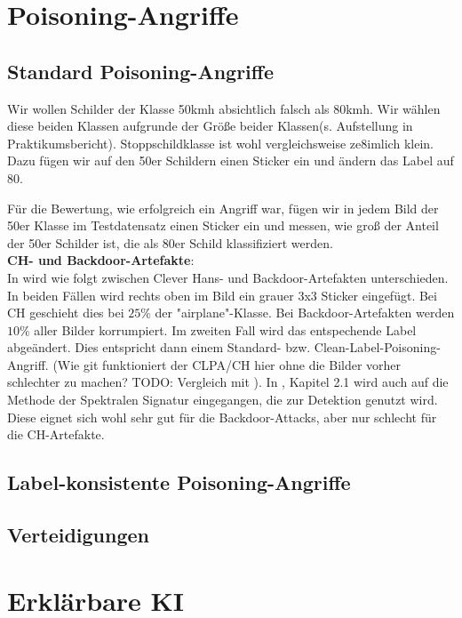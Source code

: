 \documentclass[twoside, 11pt,a4paper]{article}
\numberwithin{equation}{section}
\begin{document}
	
	\section{Poisoning-Angriffe} \label{chapter_poisoningattacks}
	\subsection{Standard Poisoning-Angriffe}
	Wir wollen Schilder der Klasse 50kmh absichtlich falsch als 80kmh. Wir wählen diese beiden Klassen aufgrunde der Größe beider Klassen(s. Aufstellung in Praktikumsbericht). Stoppschildklasse ist wohl vergleichsweise ze8imlich klein.\\
	
	Dazu fügen wir auf den 50er Schildern einen Sticker ein und ändern das Label auf 80.
	
	Für die Bewertung, wie erfolgreich ein Angriff war, fügen wir in jedem Bild der 50er Klasse im Testdatensatz einen Sticker ein und messen, wie groß der Anteil der 50er Schilder ist, die als 80er Schild klassifiziert werden.\\
	
	\noindent \textbf{CH- und Backdoor-Artefakte}:\\
	In \cite{imagenet_unhansed_v2} wird wie folgt zwischen Clever Hans- und Backdoor-Artefakten unterschieden. In beiden Fällen wird rechts oben im Bild ein grauer 3x3 Sticker eingefügt.
	Bei CH geschieht dies bei $25 \%$ der "airplane"-Klasse. Bei Backdoor-Artefakten werden $10 \%$ aller Bilder korrumpiert. Im zweiten Fall wird das entspechende Label abgeändert. Dies entspricht dann einem Standard- bzw. Clean-Label-Poisoning-Angriff. (Wie git funktioniert der CLPA/CH hier ohne die Bilder vorher schlechter zu machen? TODO: Vergleich mit \cite{labelconsistent}). In \cite{imagenet_unhansed_v2}, Kapitel 2.1 wird auch auf die Methode der Spektralen Signatur \cite{spectral_signatures} eingegangen, die zur Detektion genutzt wird. Diese eignet sich wohl sehr gut für die Backdoor-Attacks, aber nur schlecht für die CH-Artefakte.
	
	
	\subsection{Label-konsistente Poisoning-Angriffe}
	\subsection{Verteidigungen}
	\section{Erklärbare KI} \label{chapter_xai}
	
\end{document}
